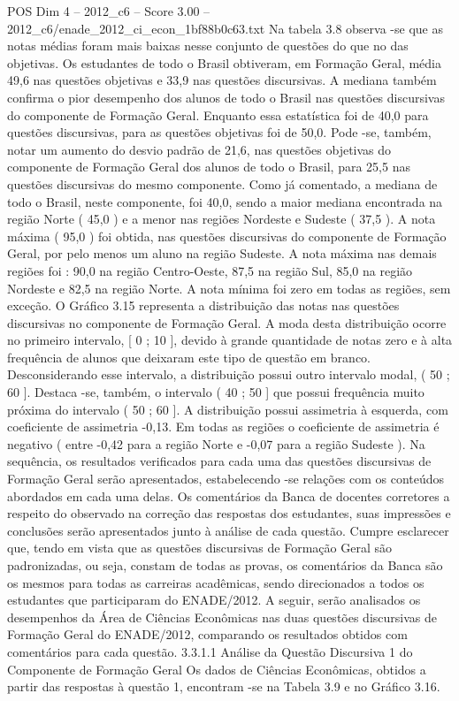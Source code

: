 \begin{textsample}{POS Dim 4 – 2012\_c6 – Score 3.00 – 2012\_c6/enade\_2012\_ci\_econ\_1bf88b0c63.txt}
Na tabela 3.8 observa -se que as notas médias foram mais baixas nesse conjunto de questões do que no das objetivas.
Os estudantes de todo o Brasil obtiveram, em Formação Geral, média 49,6 nas questões objetivas e 33,9 nas questões discursivas.
A mediana também confirma o pior desempenho dos alunos de todo o Brasil nas questões discursivas do componente de Formação Geral.
Enquanto essa estatística foi de 40,0 para questões discursivas, para as questões objetivas foi de 50,0.
Pode -se, também, notar um aumento do desvio padrão de 21,6, nas questões objetivas do componente de Formação Geral dos alunos de todo o Brasil, para 25,5 nas questões discursivas do mesmo componente.
Como já comentado, a mediana de todo o Brasil, neste componente, foi 40,0, sendo a maior mediana encontrada na região Norte ( 45,0 ) e a menor nas regiões Nordeste e Sudeste ( 37,5 ).
A nota máxima ( 95,0 ) foi obtida, nas questões discursivas do componente de Formação Geral, por pelo menos um aluno na região Sudeste.
A nota máxima nas demais regiões foi : 90,0 na região Centro-Oeste, 87,5 na região Sul, 85,0 na região Nordeste e 82,5 na região Norte.
A nota mínima foi zero em todas as regiões, sem exceção.
O Gráfico 3.15 representa a distribuição das notas nas questões discursivas no componente de Formação Geral.
A moda desta distribuição ocorre no primeiro intervalo, [ 0 ; 10 ], devido à grande quantidade de notas zero e à alta frequência de alunos que deixaram este tipo de questão em branco.
Desconsiderando esse intervalo, a distribuição possui outro intervalo modal, ( 50 ; 60 ].
Destaca -se, também, o intervalo ( 40 ; 50 ] que possui frequência muito próxima do intervalo ( 50 ; 60 ].
A distribuição possui assimetria à esquerda, com coeficiente de assimetria -0,13.
Em todas as regiões o coeficiente de assimetria é negativo ( entre -0,42 para a região Norte e -0,07 para a região Sudeste ).
Na sequência, os resultados verificados para cada uma das questões discursivas de Formação Geral serão apresentados, estabelecendo -se relações com os conteúdos abordados em cada uma delas.
Os comentários da Banca de docentes corretores a respeito do observado na correção das respostas dos estudantes, suas impressões e conclusões serão apresentados junto à análise de cada questão.
Cumpre esclarecer que, tendo em vista que as questões discursivas de Formação Geral são padronizadas, ou seja, constam de todas as provas, os comentários da Banca são os mesmos para todas as carreiras acadêmicas, sendo direcionados a todos os estudantes que participaram do ENADE/2012.
A seguir, serão analisados os desempenhos da Área de Ciências Econômicas nas duas questões discursivas de Formação Geral do ENADE/2012, comparando os resultados obtidos com comentários para cada questão. 3.3.1.1 Análise da Questão Discursiva 1 do Componente de Formação Geral Os dados de Ciências Econômicas, obtidos a partir das respostas à questão 1, encontram -se na Tabela 3.9 e no Gráfico 3.16.

\end{textsample}
